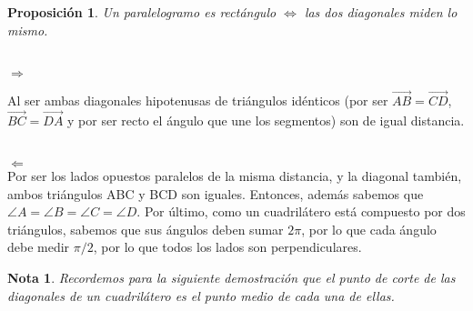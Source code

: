 \documentclass[11pt, a4paper]{article}
\makeatletter
\newif\IfInSansMode
\let\oldsf\sffamily
\renewcommand*{\sffamily}{\oldsf\mathversion{sans}\InSansModetrue}
\let\oldnorm\normalfont
\renewcommand*{\normalfont}{\oldnorm\InSansModefalse\mathversion{normal}}
\renewenvironment{proof}[1][\proofname] {\vspace{-15pt}\par\pushQED{\qed}\normalfont\topsep6\p@\@plus6\p@\relax\trivlist\item[\hskip\labelsep\it#1\@addpunct{.}]\ignorespaces}{\popQED\endtrivlist\@endpefalse}
\renewcommand{\vec}{\overrightarrow}
\renewenvironment{proof}[1][\proofname] {\par\pushQED{\qed}\normalfont\topsep6\p@\@plus6\p@\relax\trivlist\item[\hskip\labelsep\itshape\sffamily#1\@addpunct{.}]\ignorespaces}{\popQED\endtrivlist\@endpefalse}
\theoremstyle{theorem-style}
\newtheorem{nprop}{Proposición}[section]
\theoremstyle{definition-style}
\theoremstyle{remark-style}
\newtheorem*{nota}{Nota}
\theoremstyle{example-style}
\makeatother
\begin{document}
\begin{nprop}
  Un paralelogramo es rectángulo $\iff$ las dos diagonales miden lo mismo.
\end{nprop}
\begin{proof}\hfill \\
  $\boxed{\Rightarrow}$\hfill\\
   \begin{minipage}[c]{0.75\textwidth}
  
  Al ser ambas diagonales hipotenusas de triángulos idénticos (por ser $\vec{AB}=\vec{CD}$, $\vec{BC}=\vec{DA}$ y por ser recto el ángulo que une los segmentos) son de igual distancia.\hfill

  \end{minipage}\hfill
  \begin{minipage}[]{0.2\textwidth}
  

  
 
  \end{minipage}\\
  $\boxed{\Leftarrow}$ \\
  Por ser los lados opuestos paralelos de la misma distancia, y la diagonal también, ambos triángulos ABC y BCD son iguales. Entonces, además sabemos que  $\angle A = \angle
 B = \angle C  = \angle D$. Por último, como un cuadrilátero está compuesto por dos triángulos, sabemos que sus ángulos deben sumar $2\pi$, por lo que cada ángulo debe
  medir $\pi/2$, por lo que todos los lados son perpendiculares.
  
\end{proof}

\begin{nota}
	Recordemos para la siguiente demostración que el punto de corte de las diagonales de un cuadrilátero es el punto medio de cada una de ellas.
\end{nota}
\end{document}

